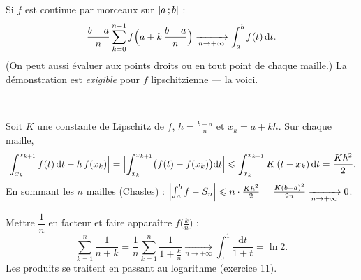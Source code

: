 \noindent
\begin{minipage}[c]{0.55\linewidth}
\begin{theoreme}
Si $f$ est continue par morceaux sur $\mathopen{[}a\,{;}\,b\mathclose{]}$ :
\[
\frac{b-a}{n}\sum_{k=0}^{n-1}f\Bigl(a+k\,\frac{b-a}{n}\Bigr)
\xrightarrow[n\to+\infty]{}\int_{a}^{b}f(t)\,\mathrm{d}t .
\]
(On peut aussi évaluer aux points droits ou en tout point de chaque
maille.) La démonstration est \emph{exigible} pour $f$ lipschitzienne —
la voici.
\end{theoreme}
\end{minipage}\hfill
\begin{minipage}[c]{0.41\linewidth}
\centering
{}\\[0.5mm]
\end{minipage}

\begin{demonstration}
Soit $K$ une constante de Lipschitz de $f$, $h=\frac{b-a}{n}$ et
$x_k=a+kh$. Sur chaque maille,
\[
\Bigl|\int_{x_k}^{x_{k+1}}f(t)\,\mathrm{d}t-h\,f(x_k)\Bigr|
=\Bigl|\int_{x_k}^{x_{k+1}}\bigl(f(t)-f(x_k)\bigr)\mathrm{d}t\Bigr|
\leqslant\int_{x_k}^{x_{k+1}}K\,(t-x_k)\,\mathrm{d}t=\frac{K h^{2}}{2}.
\]
En sommant les $n$ mailles (Chasles) :
$\Bigl|\int_{a}^{b}f-S_n\Bigr|\leqslant n\cdot\frac{Kh^{2}}{2}
=\frac{K(b-a)^{2}}{2n}\xrightarrow[n\to+\infty]{}0$.
\end{demonstration}

\begin{savoirfaire}
Mettre $\dfrac1n$ en facteur et faire apparaître $f\bigl(\tfrac kn\bigr)$ :
\[
\sum_{k=1}^{n}\frac{1}{n+k}
=\frac1n\sum_{k=1}^{n}\frac{1}{1+\frac kn}
\xrightarrow[n\to+\infty]{}\int_{0}^{1}\frac{\mathrm{d}t}{1+t}=\ln2 .
\]
Les produits se traitent en passant au logarithme (exercice 11).
\end{savoirfaire}

